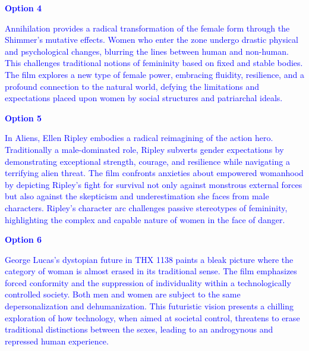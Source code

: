 \documentclass[11pt,fleqn]{book} %
\begin{document}
\begin{exercise}
    \textcolor{blue}{
\textbf{Option 4}
}
    
    \textcolor{blue}{
    Annihilation provides a radical transformation of the female form through the Shimmer's  mutative effects. Women who enter the zone undergo drastic physical and psychological changes, blurring the lines between human and non-human. This challenges traditional notions of femininity based on fixed and stable bodies. The film explores a new type of female power, embracing fluidity, resilience, and a profound connection to the natural world, defying the limitations and expectations placed upon women by social structures and patriarchal ideals.}

    \textcolor{blue}{
\textbf{Option 5}
}
    
    \textcolor{blue}{
    In Aliens, Ellen Ripley embodies a radical reimagining of the action hero. Traditionally a male-dominated role, Ripley subverts gender expectations by demonstrating exceptional strength, courage, and resilience while navigating a terrifying alien threat. The film confronts anxieties about empowered womanhood by depicting Ripley's fight for survival not only against monstrous external forces but also against the skepticism and underestimation she faces from male characters. Ripley's character arc challenges passive stereotypes of femininity, highlighting the complex and capable nature of women in the face of danger.}

    \textcolor{blue}{
\textbf{Option 6}
}
    
    \textcolor{blue}{
    George Lucas's dystopian future in THX 1138 paints a bleak picture where the category of woman is almost erased in its traditional sense.  The film emphasizes forced conformity and the suppression of individuality within a technologically controlled society. Both men and women are subject to the same depersonalization and dehumanization. This  futuristic vision presents a chilling exploration of how technology, when aimed at societal control, threatens to erase traditional distinctions between the sexes, leading to an androgynous and repressed human experience.}
\end{exercise}
\end{document}

